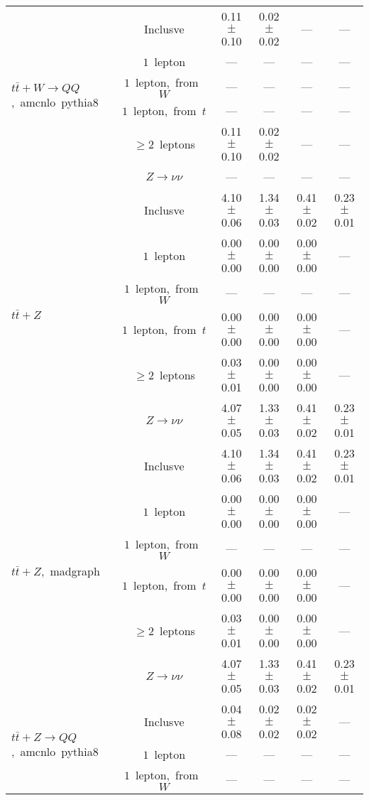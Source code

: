 \documentclass{article}
\begin{document}
\begin{longtable}{|l|c|c|c|c|c|}
\hline 
\multirow{6}{*}{$t\bar{t}+W{\rightarrow}QQ$,~amcnlo~pythia8} & Inclusve  & 0.11 $\pm$ 0.10  & 0.02 $\pm$ 0.02  & ---  & --- \\* 
 & $1$~lepton  & ---  & ---  & ---  & --- \\* 
 & $1$~lepton,~from~$W$  & ---  & ---  & ---  & --- \\* 
 & $1$~lepton,~from~$t$  & ---  & ---  & ---  & --- \\* 
 & $\ge2$~leptons  & 0.11 $\pm$ 0.10  & 0.02 $\pm$ 0.02  & ---  & --- \\* 
 & $Z\rightarrow\nu\nu$  & ---  & ---  & ---  & --- \\* 
\hline 
\multirow{6}{*}{$t\bar{t}+Z$} & Inclusve  & 4.10 $\pm$ 0.06  & 1.34 $\pm$ 0.03  & 0.41 $\pm$ 0.02  & 0.23 $\pm$ 0.01 \\* 
 & $1$~lepton  & 0.00 $\pm$ 0.00  & 0.00 $\pm$ 0.00  & 0.00 $\pm$ 0.00  & --- \\* 
 & $1$~lepton,~from~$W$  & ---  & ---  & ---  & --- \\* 
 & $1$~lepton,~from~$t$  & 0.00 $\pm$ 0.00  & 0.00 $\pm$ 0.00  & 0.00 $\pm$ 0.00  & --- \\* 
 & $\ge2$~leptons  & 0.03 $\pm$ 0.01  & 0.00 $\pm$ 0.00  & 0.00 $\pm$ 0.00  & --- \\* 
 & $Z\rightarrow\nu\nu$  & 4.07 $\pm$ 0.05  & 1.33 $\pm$ 0.03  & 0.41 $\pm$ 0.02  & 0.23 $\pm$ 0.01 \\* 
\hline 
\multirow{6}{*}{$t\bar{t}+Z$,~madgraph} & Inclusve  & 4.10 $\pm$ 0.06  & 1.34 $\pm$ 0.03  & 0.41 $\pm$ 0.02  & 0.23 $\pm$ 0.01 \\* 
 & $1$~lepton  & 0.00 $\pm$ 0.00  & 0.00 $\pm$ 0.00  & 0.00 $\pm$ 0.00  & --- \\* 
 & $1$~lepton,~from~$W$  & ---  & ---  & ---  & --- \\* 
 & $1$~lepton,~from~$t$  & 0.00 $\pm$ 0.00  & 0.00 $\pm$ 0.00  & 0.00 $\pm$ 0.00  & --- \\* 
 & $\ge2$~leptons  & 0.03 $\pm$ 0.01  & 0.00 $\pm$ 0.00  & 0.00 $\pm$ 0.00  & --- \\* 
 & $Z\rightarrow\nu\nu$  & 4.07 $\pm$ 0.05  & 1.33 $\pm$ 0.03  & 0.41 $\pm$ 0.02  & 0.23 $\pm$ 0.01 \\* 
\hline 
\multirow{6}{*}{$t\bar{t}+Z{\rightarrow}QQ$,~amcnlo~pythia8} & Inclusve  & 0.04 $\pm$ 0.08  & 0.02 $\pm$ 0.02  & 0.02 $\pm$ 0.02  & --- \\* 
 & $1$~lepton  & ---  & ---  & ---  & --- \\* 
 & $1$~lepton,~from~$W$  & ---  & ---  & ---  & --- \\* 

\end{longtable}
\end{document}

